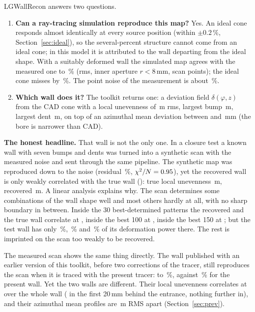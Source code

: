 \documentclass[11pt,a4paper]{article}
\newcommand{\um}{\,\textmu m}
\begin{document}
LGWallRecon answers two questions.

\begin{enumerate}
\item \textbf{Can a ray-tracing simulation reproduce this map?} Yes. An ideal cone responds almost
identically at every source position (within $\pm0.2\,\%$, Section~\ref{sec:ideal}), so the
several-percent structure cannot come from an ideal cone; in this model it is attributed to the wall
departing from the ideal shape. With a suitably deformed wall the simulated map agrees with the
measured one to \RmsFit\,\% (rms, inner aperture $r<8$\,mm, \Npts{} scan points); the ideal cone
misses by \RmsIdeal\,\%. The point noise of the measurement is about \NoisePct\,\%.
\item \textbf{Which wall does it?} The toolkit returns one: a deviation field $\delta(\varphi,z)$
from the CAD cone with a local unevenness of \LocRms\um{} rms, largest bump \LocMin\um, largest dent
\LocMax\um, on top of an azimuthal mean deviation between \MeanMax{} and \MeanMin\,mm (the bore is narrower than CAD).
\end{enumerate}

\textbf{The honest headline.} That wall is not the only one. In a closure test a known wall with
seven bumps and dents was turned into a synthetic scan with the measured noise and sent through the
same pipeline. The synthetic map was reproduced down to the noise (residual \ClMapRms\,\%,
$\chi^2/N=0.95$), yet the recovered wall is only weakly correlated with the true wall
(\ClCorrAll): true local unevenness \ClRmsTrue\um, recovered \ClRmsRec\um. A linear analysis explains
why. The scan determines some combinations of the wall shape well and most others hardly at all, with
no sharp boundary in between. Inside the 30 best-determined patterns the recovered and the true wall
correlate at \ResCThirty, inside the best 100 at \ResCHundred, inside the best 150 at \ResCOneFifty;
but the test wall has only \ResFThirty\,\%, \ResFHundred\,\% and \ResFOneFifty\,\% of its deformation
power there. The rest is imprinted on the scan too weakly to be recovered.

The measured scan shows the same thing directly. The wall published with an earlier version of this
toolkit, before two corrections of the tracer, still reproduces the scan when it is traced with the
present tracer: to \PrevRmsEarlier\,\%, against \PrevRmsNow\,\% for the present wall. Yet the two
walls are different. Their local unevenness correlates at \PrevCorr{} over the whole wall
(\PrevCorrEntrance{} in the first 20\,mm behind the entrance, nothing further in), and their
azimuthal mean profiles are \PrevProfDiff\um{} RMS apart (Section~\ref{sec:prev}).
\end{document}
